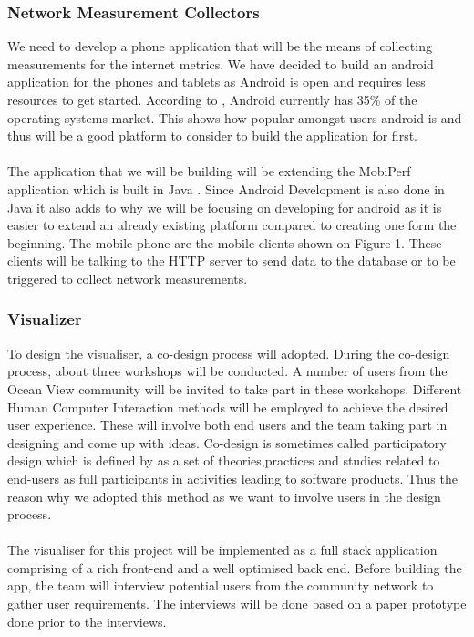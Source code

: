 \subsubsection{Network Measurement Collectors}
We need to develop a phone application that will be the means of collecting measurements for the internet metrics. We have decided to build an android application for the phones and tablets as Android is open and requires less resources to get started. According to \cite{statcounter_global_stats}, Android currently has 35\% of the operating systems market. This shows how popular amongst users android is and thus will be a good platform to consider to build the application for first. 
\paragraph{}
The application that we will be building will be extending the MobiPerf application which is built in Java \cite{m-lab}. Since Android Development is also done in Java it also adds to why we will be focusing on developing for android as it is easier to extend an already existing platform compared to creating one form the beginning. The mobile phone are the mobile clients shown on Figure 1. These clients will be talking to the HTTP server to send data to the database or to be triggered to collect network measurements.
\subsubsection{Visualizer}
To design the visualiser, a co-design process will adopted. During the co-design process, about three workshops  will be conducted. A number of users from the Ocean View community will be invited to take part in these workshops. Different Human Computer Interaction methods will be employed to achieve the desired user experience. These will involve both end users and the team taking part in designing and come up with ideas. Co-design is sometimes called participatory design which is defined by \cite{ctx2100202260004041} as a set of theories,practices and studies related to end-users as full participants in activities leading to software products. Thus the reason why we adopted this method as we want to involve users in the design process.
\paragraph{}
The visualiser for this project will be implemented as a full stack application comprising of a rich front-end and a well optimised back end. Before building the app, the team will interview potential users from the community network to gather user requirements. The interviews will be done based on a paper prototype done prior to the interviews.
